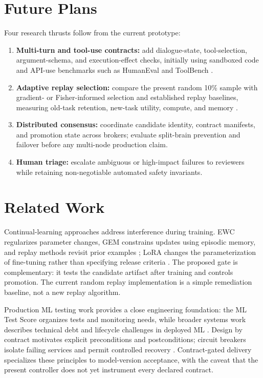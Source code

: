\documentclass[conference]{IEEEtran}
\begin{document}
\section{Future Plans}
Four research thrusts follow from the current prototype:
\begin{enumerate}
\item \textbf{Multi-turn and tool-use contracts:} add dialogue-state, tool-selection, argument-schema, and execution-effect checks, initially using sandboxed code and API-use benchmarks such as HumanEval and ToolBench \cite{DBLP:journals/corr/abs-2107-03374,ICLR2024_28e50ee5}.
\item \textbf{Adaptive replay selection:} compare the present random 10\% sample with gradient- or Fisher-informed selection and established replay baselines, measuring old-task retention, new-task utility, compute, and memory \cite{NEURIPS2019_fa7cdfad,NIPS2017_f8752278}.
\item \textbf{Distributed consensus:} coordinate candidate identity, contract manifests, and promotion state across brokers; evaluate split-brain prevention and failover before any multi-node production claim.
\item \textbf{Human triage:} escalate ambiguous or high-impact failures to reviewers while retaining non-negotiable automated safety invariants.
\end{enumerate}

\section{Related Work}
Continual-learning approaches address interference during training. EWC regularizes parameter changes, GEM constrains updates using episodic memory, and replay methods revisit prior examples \cite{kirkpatrick2017overcoming,NIPS2017_f8752278,NEURIPS2019_fa7cdfad}; LoRA changes the parameterization of fine-tuning rather than specifying release criteria \cite{hu2022yelong}. The proposed gate is complementary: it tests the candidate artifact after training and controls promotion. The current random replay implementation is a simple remediation baseline, not a new replay algorithm.

Production ML testing work provides a close engineering foundation: the ML Test Score organizes tests and monitoring needs, while broader systems work describes technical debt and lifecycle challenges in deployed ML \cite{8258038,NIPS2015_86df7dcf,8804457}. Design by contract motivates explicit preconditions and postconditions; circuit breakers isolate failing services and permit controlled recovery \cite{meyer1997object,nygard2007release,10.1145/3542929.3563466}. Contract-gated delivery specializes these principles to model-version acceptance, with the caveat that the present controller does not yet instrument every declared contract.
\end{document}
